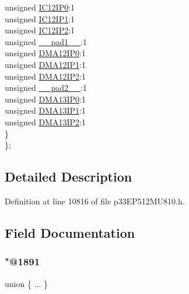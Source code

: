 \begin{DoxyCompactItemize}
\begin{tabbing}
\>\>unsigned \hyperlink{structtag_i_p_c32_b_i_t_s_ac7eb17c0023b4ed029c4bd0c78b60691}{IC12IP0}:1\\
\>\>unsigned \hyperlink{structtag_i_p_c32_b_i_t_s_a7f61e0d136e22d30694e9cf8b591e78b}{IC12IP1}:1\\
\>\>unsigned \hyperlink{structtag_i_p_c32_b_i_t_s_a0735699fb3ba3d935e990f8fc5cd685a}{IC12IP2}:1\\
\>\>unsigned \hyperlink{structtag_i_p_c32_b_i_t_s_acaf2d0924a107ec6e8d2e31febaf66f9}{\_\_pad1\_\_}:1\\
\>\>unsigned \hyperlink{structtag_i_p_c32_b_i_t_s_a5a7c0b5f6a431509f504eae261600a4c}{DMA12IP0}:1\\
\>\>unsigned \hyperlink{structtag_i_p_c32_b_i_t_s_a75bf25567f5d1a65b9d113219c6f8dce}{DMA12IP1}:1\\
\>\>unsigned \hyperlink{structtag_i_p_c32_b_i_t_s_a7e573b233f34505cc010b589df8cacd1}{DMA12IP2}:1\\
\>\>unsigned \hyperlink{structtag_i_p_c32_b_i_t_s_a4d97cc5f7d51d22fc2bf3eab35c9cb7f}{\_\_pad2\_\_}:1\\
\>\>unsigned \hyperlink{structtag_i_p_c32_b_i_t_s_a9e79ce37ce59833ee8ed83daa4e6d53a}{DMA13IP0}:1\\
\>\>unsigned \hyperlink{structtag_i_p_c32_b_i_t_s_ae2c690894759264fd485adc735089b6d}{DMA13IP1}:1\\
\>\>unsigned \hyperlink{structtag_i_p_c32_b_i_t_s_a9769f97e14ab22fc2de95d1debc41a82}{DMA13IP2}:1\\
\>\} \\
\}; \\

\end{tabbing}\end{DoxyCompactItemize}


\subsection{Detailed Description}


Definition at line 10816 of file p33\+E\+P512\+M\+U810.\+h.



\subsection{Field Documentation}
\mbox{\label{structtag_i_p_c32_b_i_t_s_aeb0696d71351ba3904ae4db7441807e4}} 
\subsubsection{\texorpdfstring{"@1891}{@1891}}
{\footnotesize\ttfamily union \{ ... \} }


